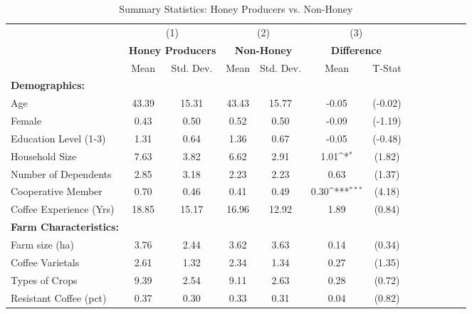 \begin{table}[htbp]\centering \small
\def\sym#1{\ifmmode^{#1}\else\(^{#1}\)\fi}
\caption{Summary Statistics: Honey Producers vs. Non-Honey \label{summary_honey}}
\begin{tabular}{l*{3}{cccc}}
\toprule
                &\multicolumn{2}{c}{(1)}&\multicolumn{2}{c}{(2)}&\multicolumn{2}{c}{(3)}     \\
                &\multicolumn{2}{c}{\textbf{Honey Producers}}&\multicolumn{2}{c}{\textbf{  Non-Honey  }}&\multicolumn{2}{c}{\textbf{Difference}}\\
                &     Mean&Std. Dev.&     Mean&Std. Dev.&     Mean         &   T-Stat\\
\midrule
\textbf{Demographics:}&         &         &         &         &                  &         \\
\addlinespace
Age             &    43.39&    15.31&    43.43&    15.77&    -0.05         &  (-0.02)\\
\addlinespace
Female          &     0.43&     0.50&     0.52&     0.50&    -0.09         &  (-1.19)\\
\addlinespace
Education Level (1-3)&     1.31&     0.64&     1.36&     0.67&    -0.05         &  (-0.48)\\
\addlinespace
Household Size  &     7.63&     3.82&     6.62&     2.91&     1.01\sym{*}  &   (1.82)\\
\addlinespace
Number of Dependents&     2.85&     3.18&     2.23&     2.23&     0.63         &   (1.37)\\
\addlinespace
Cooperative Member&     0.70&     0.46&     0.41&     0.49&     0.30\sym{***}&   (4.18)\\
\addlinespace
Coffee Experience (Yrs)&    18.85&    15.17&    16.96&    12.92&     1.89         &   (0.84)\\
\addlinespace
\textbf{Farm Characteristics:}&         &         &         &         &                  &         \\
\addlinespace
Farm size (ha)  &     3.76&     2.44&     3.62&     3.63&     0.14         &   (0.34)\\
\addlinespace
Coffee Varietals&     2.61&     1.32&     2.34&     1.34&     0.27         &   (1.35)\\
\addlinespace
Types of Crops  &     9.39&     2.54&     9.11&     2.63&     0.28         &   (0.72)\\
\addlinespace
Resistant Coffee (pct)&     0.37&     0.30&     0.33&     0.31&     0.04         &   (0.82)\\

\end{tabular}
\end{table}
